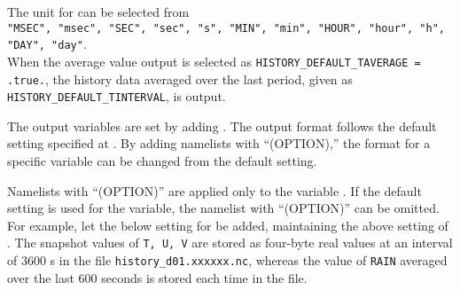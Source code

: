 The unit for  can be selected from \\
\verb|"MSEC", "msec", "SEC", "sec", "s", "MIN", "min", "HOUR", "hour", "h", "DAY", "day"|.\\
When the average value output is selected as \verb|HISTORY_DEFAULT_TAVERAGE = .true.|, the history data averaged over the last period, given as \verb|HISTORY_DEFAULT_TINTERVAL|, is output.


The output variables are set by adding . The output format follows the default setting specified at . By adding namelists with ``(OPTION),'' the format for a specific variable can be changed from the default setting.



Namelists with ``(OPTION)'' are applied only to the variable . If the default setting is used for the variable, the namelist with ``(OPTION)'' can be omitted. For example, let the below setting for  be added, maintaining the above setting of . The snapshot values of \verb|T, U, V| are stored as four-byte real values at an interval of 3600 s in the file \verb|history_d01.xxxxxx.nc|, whereas the value of \verb|RAIN| averaged over the last 600 seconds is stored each time in the file. 


